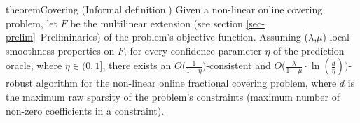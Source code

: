 \begin{restatable}{theorem}{Covering}
\label{thm:covering}
(Informal definition.) Given a non-linear online covering problem, let $F$ be the multilinear extension (see section \ref{sec-prelim}~Preliminaries) of the problem's objective function. Assuming ($\lambda$,$\mu$)-local-smoothness properties on $F$, for every confidence parameter $\eta$ of the prediction oracle, where $\eta \in (0,1]$, there exists an $O\bigl( \frac{1}{1 - \eta} \bigr)$-consistent and
$O\bigl( \frac{\lambda}{1 - \mu}  \cdot \ln \left(\frac{d}{\eta}\right) \bigr)$-robust algorithm for the non-linear online fractional covering problem, where $d$ is the maximum raw sparsity of the problem's constraints (maximum number of non-zero coefficients in a constraint).
\end{restatable}

%


